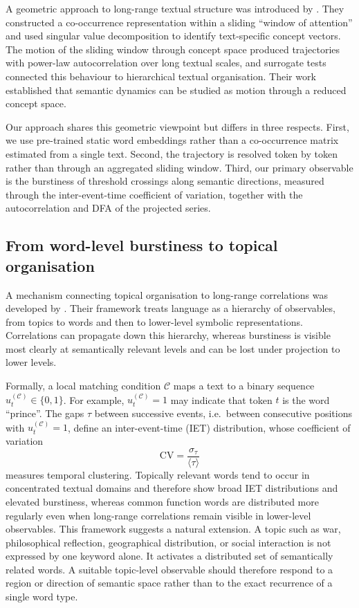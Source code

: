 \documentclass[12pt,a4paper]{article}
\newcommand{\meantau}{\langle\tau\rangle}
\newcommand{\sigmatau}{\sigma_\tau}
\newcommand{\CV}{\mathrm{CV}}
\begin{document}
A geometric approach to long-range textual structure was introduced by
\citet{AlvarezLacalle2006}.
They constructed a co-occurrence representation within a sliding
``window of attention'' and used singular value decomposition to identify
text-specific concept vectors.
The motion of the sliding window through concept space produced
trajectories with power-law autocorrelation over long textual scales, and
surrogate tests connected this behaviour to hierarchical textual
organisation.
Their work established that semantic dynamics can be studied as motion
through a reduced concept space.

Our approach shares this geometric viewpoint but differs in three
respects.
First, we use pre-trained static word embeddings rather than a
co-occurrence matrix estimated from a single text.
Second, the trajectory is resolved token by token rather than through an
aggregated sliding window.
Third, our primary observable is the burstiness of threshold crossings
along semantic directions, measured through the inter-event-time
coefficient of variation, together with the autocorrelation and DFA of
the projected series.


\subsection{From word-level burstiness to topical organisation}

A mechanism connecting topical organisation to long-range correlations
was developed by \citet{Altmann2012}.
Their framework treats language as a hierarchy of observables, from
topics to words and then to lower-level symbolic representations.
Correlations can propagate down this hierarchy, whereas burstiness is
visible most clearly at semantically relevant levels and can be lost
under projection to lower levels.

Formally, a local matching condition $\mathcal{C}$ maps a text to a
binary sequence $u_t^{(\mathcal{C})}\in\{0,1\}$.
For example, $u_t^{(\mathcal{C})}=1$ may indicate that token $t$ is the
word ``prince''.
The gaps $\tau$ between successive events, i.e.\ between consecutive
positions with $u_t^{(\mathcal{C})}=1$, define an inter-event-time
(IET) distribution, whose coefficient of variation
\begin{equation}
  \CV=\frac{\sigmatau}{\meantau}
\end{equation}
measures temporal clustering.
Topically relevant words tend to occur in concentrated textual domains
and therefore show broad IET distributions and elevated burstiness,
whereas common function words are distributed more regularly even when
long-range correlations remain visible in lower-level observables.
This framework suggests a natural extension.
A topic such as war, philosophical reflection, geographical
distribution, or social interaction is not expressed by one keyword
alone.
It activates a distributed set of semantically related words.
A suitable topic-level observable should therefore respond to a region
or direction of semantic space rather than to the exact recurrence of a
single word type.
\end{document}
